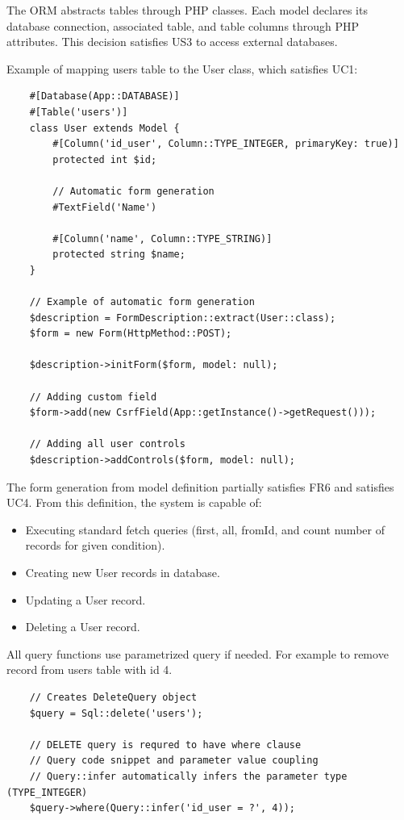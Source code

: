 The ORM abstracts tables through PHP classes.
Each model declares its database connection, associated table, and table columns through PHP attributes.
This decision satisfies US3 to access external databases.

Example of mapping users table to the User class, which satisfies UC1:
\begin{verbatim}
    #[Database(App::DATABASE)]
    #[Table('users')]
    class User extends Model {
        #[Column('id_user', Column::TYPE_INTEGER, primaryKey: true)]
        protected int $id;

        // Automatic form generation
        #TextField('Name')

        #[Column('name', Column::TYPE_STRING)]
        protected string $name;
    }

    // Example of automatic form generation
    $description = FormDescription::extract(User::class);
    $form = new Form(HttpMethod::POST);

    $description->initForm($form, model: null);

    // Adding custom field
    $form->add(new CsrfField(App::getInstance()->getRequest()));

    // Adding all user controls
    $description->addControls($form, model: null);
\end{verbatim}

The form generation from model definition partially satisfies FR6 and satisfies UC4.
From this definition, the system is capable of:

\begin{itemize}
    \item Executing standard fetch queries (first, all, fromId, and count number of records for given condition).
    \item Creating new User records in database.
    \item Updating a User record.
    \item Deleting a User record.
\end{itemize}

All query functions use parametrized query if needed.
For example to remove record from users table with id 4.

\begin{verbatim}
    // Creates DeleteQuery object
    $query = Sql::delete('users');

    // DELETE query is requred to have where clause
    // Query code snippet and parameter value coupling
    // Query::infer automatically infers the parameter type (TYPE_INTEGER)
    $query->where(Query::infer('id_user = ?', 4));
\end{verbatim}

